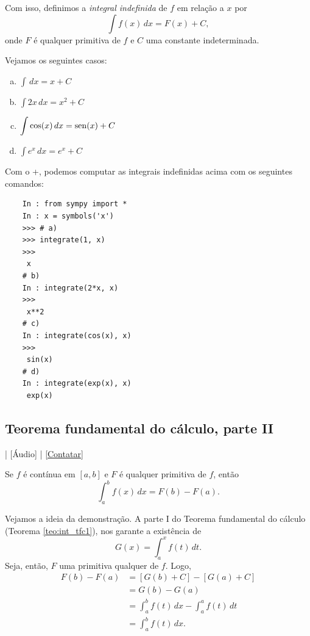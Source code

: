 Com isso, definimos a \emph{integral indefinida} de $f$ em relação a $x$ por
\begin{equation}
  \int f(x)\,dx = F(x) + C,
\end{equation}
onde $F$ é qualquer primitiva de $f$ e $C$ uma constante indeterminada.

\begin{ex}
  Vejamos os seguintes casos:
  \begin{enumerate}[a)]
  \item $\displaystyle \int \,dx = x + C$
  \item $\displaystyle \int 2x\,dx = x^2 + C$
  \item $\displaystyle \int \cos(x)\,dx = \operatorname{sen}(x) + C$
  \item $\displaystyle \int e^x\,dx = e^x + C$
  \end{enumerate}
  \ifispython
  Com o {\python}+{\sympy}, podemos computar as integrais indefinidas acima com os seguintes comandos:
  \begin{lstlisting}
    In : from sympy import *
    In : x = symbols('x')
    >>> # a)
    >>> integrate(1, x)
    >>> 
     x
    # b)
    In : integrate(2*x, x)
    >>> 
     x**2
    # c)
    In : integrate(cos(x), x)
    >>> 
     sin(x)
    # d)
    In : integrate(exp(x), x)
     exp(x)
  \end{lstlisting}
  \fi  
\end{ex}

\subsection{Teorema fundamental do cálculo, parte II}

\begin{flushright}
  [Vídeo] | [Áudio] | \href{https://phkonzen.github.io/notas/contato.html}{[Contatar]}
\end{flushright}

\begin{teo}\label{teo:int_tfc2}
  Se $f$ é contínua em $[a, b]$ e $F$ é qualquer primitiva de $f$, então
  \begin{equation}
    \int_a^b f(x)\,dx = F(b) - F(a).
  \end{equation}
\end{teo}
\begin{dem}
  Vejamos a ideia da demonstração. A parte I do Teorema fundamental do cálculo (Teorema \ref{teo:int_tfc1}), nos garante a existência de
  \begin{equation}
    G(x) = \int_a^x f(t)\,dt.
  \end{equation}
  Seja, então, $F$ uma primitiva qualquer de $f$. Logo,
  \begin{align}
    F(b) - F(a) &= [G(b) + C] - [G(a) + C] \\
                &= G(b) - G(a) \\
                &= \int_a^b f(t)\,dx - \int_a^a f(t)\,dt \\
                &= \int_a^b f(t)\,dx.
  \end{align}
\end{dem}

